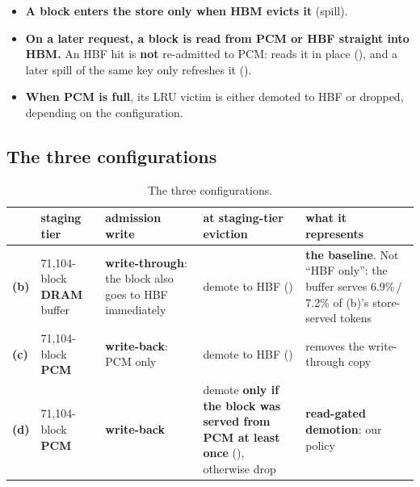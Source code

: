 \documentclass[11pt,a4paper]{article}
\newcommand{\hd}[1]{\textbf{#1}}
\begin{document}
\begin{center}
\end{center}

\begin{itemize}
  \item \textbf{A block enters the store only when HBM evicts it} (spill).
  \item \textbf{On a later request, a block is read from PCM or HBF straight
    into HBM.} An HBF hit is \textbf{not} re-admitted to PCM: 
    reads it in place (), and a later spill of the same
    key only refreshes it ().
  \item \textbf{When PCM is full}, its LRU victim is either demoted to HBF or
    dropped, depending on the configuration.
\end{itemize}

\subsection{The three configurations}

\begin{xltabular}{\linewidth}{@{}l Y{0.8} Y{1.0} Y{1.0} Y{1.2}@{}}
\caption{The three configurations.}\label{tab:configs}\\
\toprule
 & \hd{staging tier} & \hd{admission write} & \hd{at staging-tier eviction} & \hd{what it represents} \\
\midrule
\textbf{(b)} & 71,104-block \textbf{DRAM} buffer
  & \textbf{write-through}: the block also goes to HBF immediately
  & demote to HBF ()
  & \textbf{the baseline}. Not ``HBF only'': the buffer serves 6.9\%\,/\,7.2\% of (b)'s store-served tokens \\
\textbf{(c)} & 71,104-block \textbf{PCM}
  & \textbf{write-back}: PCM only
  & demote to HBF ()
  & removes the write-through copy \\
\textbf{(d)} & 71,104-block \textbf{PCM}
  & \textbf{write-back}
  & demote \textbf{only if the block was served from PCM at least once} (), otherwise drop
  & \textbf{read-gated demotion}: our policy \\
\bottomrule
\end{xltabular}
\end{document}
